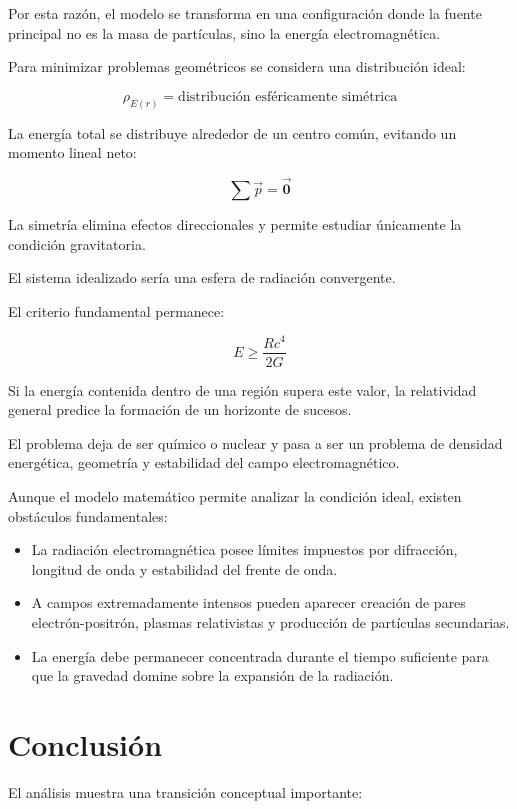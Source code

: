 \documentclass[a4paper,10pt,twocolumn]{article}
\begin{document}
Por esta razón, el modelo se transforma en una configuración donde la fuente principal no es la masa de partículas, sino la energía electromagnética.

Para minimizar problemas geométricos se considera una distribución ideal:

\begin{equation}
\rho_{E(r)}=\text{distribución esféricamente simétrica}
\end{equation}

La energía total se distribuye alrededor de un centro común, evitando un momento lineal neto:

\begin{equation}
\sum\vec{p}=\vec{\textbf{0}}
\end{equation}

La simetría elimina efectos direccionales y permite estudiar únicamente la condición gravitatoria.

El sistema idealizado sería una esfera de radiación convergente.

El criterio fundamental permanece:

\begin{equation}
E\geq\frac{Rc^4}{2G}
\end{equation}

Si la energía contenida dentro de una región supera este valor, la relatividad general predice la formación de un horizonte de sucesos.

El problema deja de ser químico o nuclear y pasa a ser un problema de densidad energética, geometría y estabilidad del campo electromagnético.

Aunque el modelo matemático permite analizar la condición ideal, existen obstáculos fundamentales:

\begin{itemize}
\item La radiación electromagnética posee límites impuestos por difracción, longitud de onda y estabilidad del frente de onda.
\item A campos extremadamente intensos pueden aparecer creación de pares electrón-positrón, plasmas relativistas y producción de partículas secundarias.
\item La energía debe permanecer concentrada durante el tiempo suficiente para que la gravedad domine sobre la expansión de la radiación.
\end{itemize}

\section{Conclusión}
El análisis muestra una transición conceptual importante:
\end{document}
